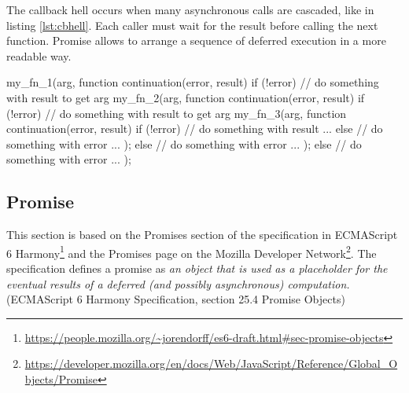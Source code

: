 The callback hell occurs when many asynchronous calls are cascaded, like in listing \ref{lst:cbhell}.
Each caller must wait for the result before calling the next function.
Promise allows to arrange a sequence of deferred execution in a more readable way.

\begin{code}[js, %
             caption={Example of a cascade of continuations}, %
             label={lst:cbhell}] %
my_fn_1(arg, function continuation(error, result) {
  if (!error) {
    // do something with result to get arg
    my_fn_2(arg, function continuation(error, result) {
      if (!error) {
        // do something with result to get arg
        my_fn_3(arg, function continuation(error, result) {
          if (!error) {
            // do something with result ...
          } else {
            // do something with error ...
          }
        });
      } else {
        // do something with error ...
      }
    });
  } else {
    // do something with error ...
  }
});
\end{code}

\subsection{Promise} \label{section:definitions:promise}


This section is based on the Promises section of the specification in ECMAScript 6 Harmony\footnote{\url{https://people.mozilla.org/~jorendorff/es6-draft.html\#sec-promise-objects}} and the Promises page on the Mozilla Developer Network\footnote{\url{https://developer.mozilla.org/en/docs/Web/JavaScript/Reference/Global_Objects/Promise}}.
The specification defines a promise as \textit{an object that is used as a placeholder for the eventual results of a deferred (and possibly asynchronous) computation.} (ECMAScript 6 Harmony Specification, section 25.4 Promise Objects)


